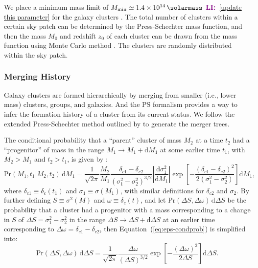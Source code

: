 \documentclass[modern]{aastex61}
\newcommand{\R}[1]{\mathrm{#1}}
\newcommand{\D}[1]{\R{d} #1}
\newcommand{\diff}[2]{\frac{\D{#1}}{\D{#2}}}
\newcommand{\LI}[1]{\textcolor{purple}{\textbf{LI:}}~\uline{#1}}
\begin{document}
We place a minimum mass limit of $M_{\R{min}} \simeq \SI{1.4e14}{\solarmass}$
\LI{[update this parameter]} for the galaxy clusters \citep{zandanel2014}.
The total number of clusters within a certain sky patch can be
determined by the Press-Schechter mass function, and then the mass
$M_0$ and redshift $z_0$ of each cluster can be drawn from the mass
function using Monte Carlo method \citep{wang2010}.
The clusters are randomly distributed within the sky patch.


\subsubsection{Merging History}
\label{sec:merging-history}

Galaxy clusters are formed hierarchically by merging from smaller (i.e.,
lower mass) clusters, groups, and galaxies.
And the PS formalism provides a way to infer the formation history
of a cluster from its current status.
We follow the extended Press-Schechter method outlined by \citet{lacey1993}
to generate the merger trees.

The conditional probability that a \enquote{parent} cluster of mass $M_2$
at a time $t_2$ had a \enquote{progenitor} of mass in the range
$M_1 \to M_1 + \D{M_1}$ at some earlier time $t_1$,
with $M_2 > M_1$ and $t_2 > t_1$, is given by
\citep{lacey1993,randall2002}:
\begin{equation}
  \label{eq:eps-condprob}
  \R{Pr}(M_1, t_1 | M_2, t_2) \,\D{M_1} = \frac{1}{\sqrt{2\pi}} \frac{M_2}{M_1}
  \frac{\delta_{c1} - \delta_{c2}}{(\sigma_1^2 - \sigma_2^2)^{3/2}}
  \left| \diff{\sigma_1^2}{M_1} \right|
  \exp \!\left[ -\frac{(\delta_{c1} - \delta_{c2})^2}
    {2(\sigma_1^2 - \sigma_2^2)} \right] \D{M_1},
\end{equation}
where
$\delta_{c1} \equiv \delta_c(t_1)$ and $\sigma_1 \equiv \sigma(M_1)$,
with similar definitions for $\delta_{c2}$ and $\sigma_2$.
By further defining $S \equiv \sigma^2(M)$ and $\omega \equiv \delta_c(t)$,
and let $\R{Pr}(\Delta S, \Delta \omega) \,\D{\Delta S}$ be the probability
that a cluster had a progenitor with a mass corresponding to a change
in $S$ of $\Delta S = \sigma_1^2 - \sigma_2^2$ in the range
$\Delta S \to \Delta S + \D{\Delta S}$ at an earlier time
corresponding to $\Delta \omega = \delta_{c1} - \delta_{c2}$,
then Equation~(\ref{eq:eps-condprob}) is simplified into:
\begin{equation}
  \label{eq:eps-condprob-simp}
  \R{Pr}(\Delta S, \Delta \omega) \,\D{\Delta S} = \frac{1}{\sqrt{2\pi}}
  \frac{\Delta\omega}{(\Delta S)^{3/2}}
  \exp \!\left[ -\frac{(\Delta\omega)^2}{2 \Delta S} \right] \D{\Delta S}.
\end{equation}
\end{document}
